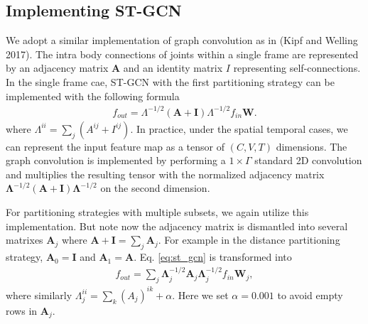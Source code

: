 \documentclass{article}
\begin{document}
\subsection{Implementing ST-GCN}
We adopt a similar implementation of graph convolution as in (Kipf and Welling 2017). The intra body connections of joints within a single frame are represented by an adjacency matrix $\mathbf{A}$ and an identity matrix $I$ representing self-connections. {\color{red}In the single frame cae, ST-GCN with the first partitioning strategy can be implemented with the following formula
\begin{align}\label{eq:st_gcn}
    f_{out} = \Lambda ^{-1/2} (\mathbf{A+I})\Lambda ^{-1/2} f_{in}  \mathbf{W}.
\end{align}}
where $\Lambda^{ii} = \sum_j (A^{ij}+ I^{ij})$. In practice, under the spatial temporal cases, we can represent the input feature map as a tensor of $(C,V,T)$ dimensions. The graph convolution is implemented by performing a $1\times \Gamma$ standard 2D convolution and multiplies the resulting tensor with the normalized adjacency matrix $\mathbf{\Lambda}^{-1/2} (\mathbf{A+I})\mathbf{\Lambda}^{-1/2}$ on the second dimension.

{\color{red}For partitioning strategies with multiple subsets,} we again utilize this implementation. But note now the adjacency matrix is dismantled into several matrixes $\mathbf{A}_j$ where $\mathbf{A+I} = \sum_j \mathbf{A}_j$. For example in the distance partitioning strategy, $\mathbf{A}_0 = \mathbf{I}$ and $\mathbf{A}_1 = \mathbf{A}$. Eq. \ref{eq:st_gcn} is transformed into 
\begin{align}\label{eq:st_gcn_multi}
    f_{out} = \sum_j \mathbf{\Lambda}_j ^{-1/2}\mathbf{A}_j\mathbf{\Lambda}_j ^{-1/2} f_{in} \mathbf{W}_j,
\end{align}
where similarly $\Lambda_j^{ii}=\sum_{k}(A_j)^{ik} + \alpha$. Here we set $\alpha =0.001$ to avoid empty rows in $\mathbf{A}_j$.
\end{document}
